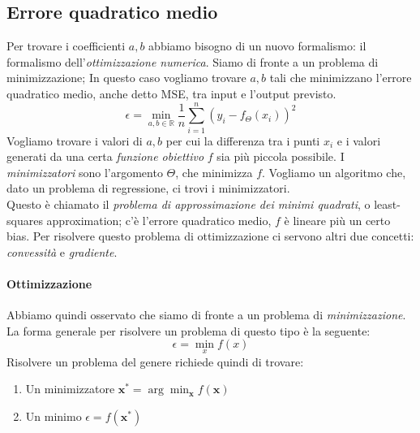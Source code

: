 \documentclass{article}
\begin{document}
        \subsection{Errore quadratico medio}
            Per trovare i coefficienti $a,b$ abbiamo bisogno di un nuovo formalismo: il formalismo dell'\emph{ottimizzazione numerica}.
             Siamo di fronte a un problema di minimizzazione; In questo caso vogliamo trovare $a,b$ tali che minimizzano l'errore 
             quadratico medio, anche detto MSE, tra input e l'output previsto.
                \[ \epsilon = \min_{a,b \in \mathbb{R}} \frac{1}{n} \sum_{i=1}^{n}(y_i - f_\Theta(x_i))^2 \]
            Vogliamo trovare i valori di $a,b$ per cui la differenza tra i punti $x_i$ e i valori generati da una certa \emph{funzione obiettivo} 
            $f$ sia più piccola possibile.
            I \emph{minimizzatori} sono l'argomento $\Theta$, che minimizza $f$. Vogliamo un algoritmo che, dato un problema di regressione, 
            ci trovi i minimizzatori. \\
            Questo è chiamato il \emph{problema di approssimazione dei minimi quadrati}, o least-squares approximation; c'è l'errore 
            quadratico medio, $f$ è lineare più un certo bias. Per risolvere questo problema di ottimizzazione ci servono altri due 
            concetti: \emph{convessità} e \emph{gradiente}.

            \paragraph{Ottimizzazione}
                Abbiamo quindi osservato che siamo di fronte a un problema di \emph{minimizzazione}. La forma generale per risolvere un problema
                di questo tipo è la seguente:
                    \[\epsilon = \min_x f(x)\]
                Risolvere un problema del genere richiede quindi di trovare:
                \begin{enumerate}
                    \item Un minimizzatore $\mathbf{x^*} = \arg \min_\mathbf{x}f(\mathbf{x})$
                    \item Un minimo $\epsilon = f(\mathbf{x^*})$
                \end{enumerate}
    
\end{document}
